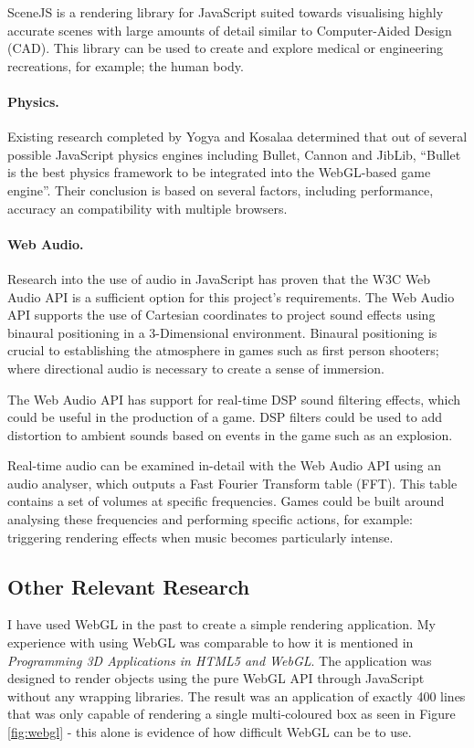 \documentclass[a4paper, 12pt]{article}
\begin{document}
SceneJS is a rendering library for JavaScript suited towards visualising highly accurate scenes with large amounts of detail similar to Computer-Aided Design (CAD). This library can be used to create and explore medical or engineering recreations, for example; the human body.\cite{scenejs}

\paragraph{Physics.}
Existing research completed by Yogya and Kosalaa determined that out of several possible JavaScript physics engines including Bullet, Cannon and JibLib, ``Bullet is the best physics framework to be integrated into the WebGL-based game engine''.\cite{yogya2014comparison} Their conclusion is based on several factors, including performance, accuracy an compatibility with multiple browsers. 

\paragraph{Web Audio.}
Research into the use of audio in JavaScript has proven that the W3C Web Audio API is a sufficient option for this project's requirements. The Web Audio API supports the use of Cartesian coordinates to project sound effects using binaural positioning in a 3-Dimensional environment.\cite{webaudio} Binaural positioning is crucial to establishing the atmosphere in games such as first person shooters; where directional audio is necessary to create a sense of immersion.

The Web Audio API has support for real-time DSP sound filtering effects, which could be useful in the production of a game. DSP filters could be used to add distortion to ambient sounds based on events in the game such as an explosion.

Real-time audio can be examined in-detail with the Web Audio API using an audio analyser, which outputs a Fast Fourier Transform table (FFT). This table contains a set of volumes at specific frequencies. Games could be built around analysing these frequencies and performing specific actions, for example: triggering rendering effects when music becomes particularly intense.

\subsection{Other Relevant Research}
I have used WebGL in the past to create a simple rendering application. My experience with using WebGL was comparable to how it is mentioned in \emph{Programming 3D Applications in HTML5 and WebGL}\cite{parisi2014programming}. The application was designed to render objects using the pure WebGL API through JavaScript without any wrapping libraries. The result was an application of exactly 400 lines that was only capable of rendering a single multi-coloured box as seen in Figure \ref{fig:webgl} - this alone is evidence of how difficult WebGL can be to use.
\end{document}
